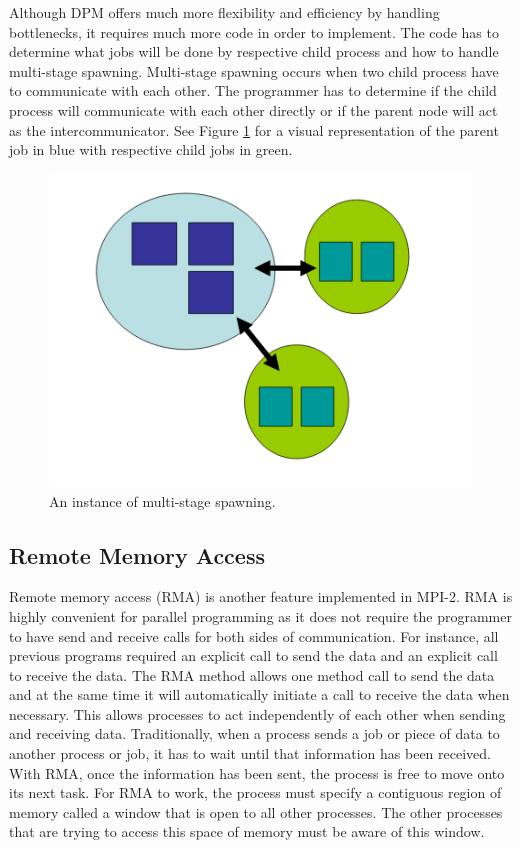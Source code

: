 	Although DPM offers much more flexibility and efficiency by handling bottlenecks, it requires much more code in order to implement. The code has to determine what jobs will be done by respective child process and how to handle multi-stage spawning. Multi-stage spawning occurs when two child process have to communicate with each other. The programmer has to determine if the child process will communicate with each other directly or if the parent node will act as the intercommunicator. See Figure \ref{fig:Multi-stage} for a visual representation of the parent job in blue with respective child jobs in green.
	
\begin{figure}
\centering
\includegraphics[scale=0.7]{Figures/multi-stage}
\decoRule
\caption[Multi-stage spawning]{An instance of multi-stage spawning.}
\label{fig:Multi-stage}
\end{figure}

\subsection {Remote Memory Access}
Remote memory access (RMA) is another feature implemented in MPI-2. RMA is highly convenient for parallel programming as it does not require the programmer to have send and receive calls for both sides of communication. For instance, all previous programs required an explicit call to send the data and an explicit call to receive the data. The RMA method allows one method call to send the data and at the same time it will automatically initiate a call to receive the data when necessary. This allows processes to act independently of each other when sending and receiving data. Traditionally, when a process sends a job or piece of data to another process or job, it has to wait until that information has been received. With RMA, once the information has been sent, the process is free to move onto its next task. For RMA to work, the process must specify a contiguous region of memory called a window that is open to all other processes. The other processes that are trying to access this space of memory must be aware of this window.


